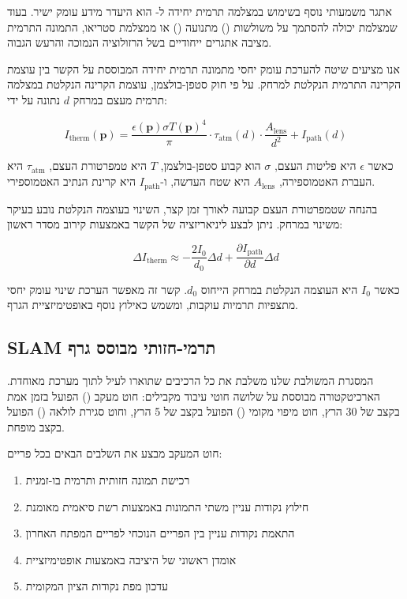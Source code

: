 אתגר משמעותי נוסף בשימוש במצלמה תרמית יחידה ל- הוא היעדר מידע עומק ישיר. בעוד שמצלמת  יכולה להסתמך על משולשות () מתנועה () או ממצלמת סטריאו, התמונה התרמית מציבה אתגרים ייחודיים בשל הרזולוציה הנמוכה והרעש הגבוה.

אנו מציעים שיטה להערכת עומק יחסי מתמונה תרמית יחידה המבוססת על הקשר בין עוצמת הקרינה התרמית הנקלטת למרחק. על פי חוק סטפן-בולצמן, עוצמת הקרינה הנקלטת במצלמה תרמית מעצם במרחק $d$ נתונה על ידי:

\begin{equation}
I_{\text{therm}}(\mathbf{p}) = \frac{\epsilon(\mathbf{p}) \sigma T(\mathbf{p})^4}{\pi} \cdot \tau_{\text{atm}}(d) \cdot \frac{A_{\text{lens}}}{d^2} + I_{\text{path}}(d)
\label{eq:ch04_thermal_radiation}
\end{equation}

כאשר $\epsilon$ היא פליטות העצם, $\sigma$ הוא קבוע סטפן-בולצמן, $T$ היא טמפרטורת העצם, $\tau_{\text{atm}}$ היא העברת האטמוספירה, $A_{\text{lens}}$ היא שטח העדשה, ו-$I_{\text{path}}$ היא קרינת הנתיב האטמוספירי.

בהנחה שטמפרטורת העצם קבועה לאורך זמן קצר, השינוי בעוצמה הנקלטת נובע בעיקר משינוי במרחק. ניתן לבצע ליניאריזציה של הקשר באמצעות קירוב מסדר ראשון:

\begin{equation}
\Delta I_{\text{therm}} \approx -\frac{2I_0}{d_0} \Delta d + \frac{\partial I_{\text{path}}}{\partial d} \Delta d
\label{eq:ch04_depth_linearization}
\end{equation}

כאשר $I_0$ היא העוצמה הנקלטת במרחק הייחוס $d_0$. קשר זה מאפשר הערכת שינוי עומק יחסי מתצפיות תרמיות עוקבות, ומשמש כאילוץ נוסף באופטימיזציית הגרף.

\subsection{SLAM תרמי-חזותי מבוסס גרף}
\label{sec:ch04_graph_thermal_visual}

המסגרת המשולבת שלנו משלבת את כל הרכיבים שתוארו לעיל לתוך מערכת  מאוחדת. הארכיטקטורה מבוססת על שלושה חוטי עיבוד מקבילים: חוט מעקב () הפועל בזמן אמת בקצב של 30 הרץ, חוט מיפוי מקומי () הפועל בקצב של 5 הרץ, וחוט סגירת לולאה () הפועל בקצב מופחת.

חוט המעקב מבצע את השלבים הבאים בכל פריים:

\begin{enumerate}
  \item רכישת תמונה חזותית ותרמית בו-זמנית
  \item חילוץ נקודות עניין משתי התמונות באמצעות רשת סיאמית מאומנת
  \item התאמת נקודות עניין בין הפריים הנוכחי לפריים המפתח האחרון
  \item אומדן ראשוני של היציבה באמצעות אופטימיזציית 
  \item עדכון מפת נקודות הציון המקומית
\end{enumerate}

